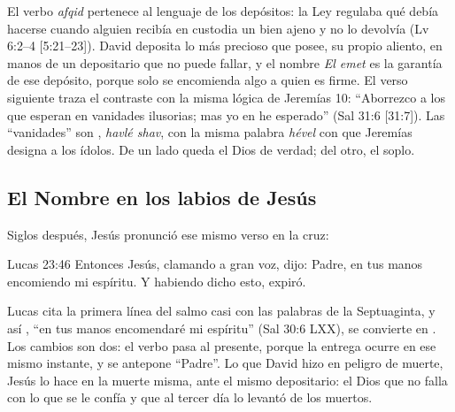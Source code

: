 El verbo \emph{afqid} pertenece al lenguaje de los depósitos: la Ley regulaba qué debía hacerse cuando alguien recibía en custodia un bien ajeno y no lo devolvía (Lv 6:2--4 [5:21--23]). David deposita lo más precioso que posee, su propio aliento, en manos de un depositario que no puede fallar, y el nombre \emph{El emet} es la garantía de ese depósito, porque solo se encomienda algo a quien es firme. El verso siguiente traza el contraste con la misma lógica de Jeremías 10: ``Aborrezco a los que esperan en vanidades ilusorias; mas yo en \SENOR{} he esperado'' (Sal 31:6 [31:7]). Las ``vanidades'' son , \emph{havlé shav}, con la misma palabra \emph{hével} con que Jeremías designa a los ídolos. De un lado queda el Dios de verdad; del otro, el soplo.


\subsection{El Nombre en los labios de Jesús}
Siglos después, Jesús pronunció ese mismo verso en la cruz:

\begin{verso}{Lucas 23:46}
Entonces Jesús, clamando a gran voz, dijo: Padre, en tus manos encomiendo mi espíritu. Y habiendo dicho esto, expiró.
\end{verso}

Lucas cita la primera línea del salmo casi con las palabras de la Septuaginta, y así , ``en tus manos encomendaré mi espíritu'' (Sal 30:6 LXX), se convierte en . Los cambios son dos: el verbo pasa al presente, porque la entrega ocurre en ese mismo instante, y se antepone ``Padre''. Lo que David hizo en peligro de muerte, Jesús lo hace en la muerte misma, ante el mismo depositario: el Dios que no falla con lo que se le confía y que al tercer día lo levantó de los muertos.


